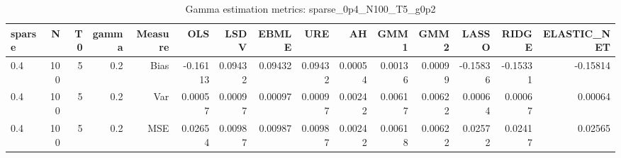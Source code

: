 \begin{table}[!htbp]\centering
\caption{Gamma estimation metrics: sparse_0p4_N100_T5_g0p2}
\label{tab:table1_sparse_0p4_N100_T5_g0p2}
\begin{tabular}{lrrrrrrrrrrrrrr}
\hline
sparse & N & T0 & gamma & Measure & OLS & LSDV & EBMLE & URE & AH & GMM1 & GMM2 & LASSO & RIDGE & ELASTIC_NET \\
\hline
0.4 & 100 & 5 & 0.2 & Bias & -0.16113 & 0.09432 & 0.09432 & 0.09432 & 0.00054 & 0.00136 & 0.00099 & -0.15836 & -0.15331 & -0.15814 \\
0.4 & 100 & 5 & 0.2 & Var & 0.00057 & 0.00097 & 0.00097 & 0.00097 & 0.00242 & 0.00617 & 0.00622 & 0.00064 & 0.00067 & 0.00064 \\
0.4 & 100 & 5 & 0.2 & MSE & 0.02654 & 0.00987 & 0.00987 & 0.00987 & 0.00242 & 0.00618 & 0.00622 & 0.02572 & 0.02417 & 0.02565 \\
\hline
\end{tabular}
\end{table}

